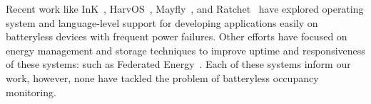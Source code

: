 Recent work like InK~\cite{ink2018sensys}, HarvOS~\cite{bhatti2017harvos}, Mayfly~\cite{hester2017mayfly}, and Ratchet~\cite{van2016intermittent} have explored operating system and language-level support for developing applications easily on batteryless devices with frequent power failures.
Other efforts have focused on energy management and storage techniques to improve uptime and responsiveness of these systems: such as Federated Energy~\cite{jhester:ufop:sensys}.
Each of these systems inform our work, however, none have tackled the problem of batteryless occupancy monitoring.
